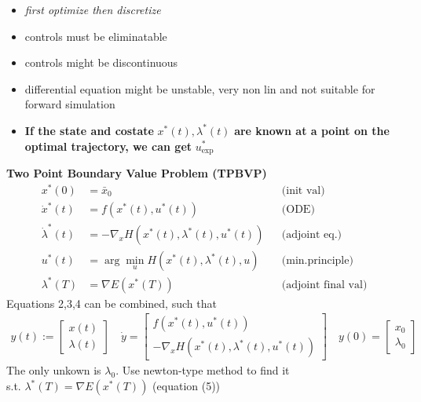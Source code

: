 
\begin{tcolorbox}[colback=gray!5!white,colframe=gray!75!black,title=\textbf{Indirect Approach}]
\begin{itemize}
	\item \textit{first optimize then discretize}
	\item controls must be eliminatable
	\item controls might be discontinuous
	\item differential equation might be unstable, very non lin and not suitable
    for forward simulation
  \item \textbf{If the state and costate} $x^*(t),\lambda^*(t)$ \textbf{are known at a point on
    the optimal trajectory, we can get} $u^*_{\mathrm{exp}}$ \\
\end{itemize}
\textbf{Two Point Boundary Value Problem (TPBVP)}
\begin{align}
	x^*(0) &= \bar{x}_0 & & \text{(init val)} \tag{1}\\
	\dot{x}^*(t) &= f(x^*(t), u^*(t))& %
                        & \text{(ODE)}\tag{2}\\
	\dot{\lambda}^*(t) &= - \nabla_x H(x^*(t), \lambda^*(t), u^*(t)) &%
                        & \text{(adjoint eq.)}\tag{3}\\
	u^*(t) &= \arg \min_u H(x^*(t), \lambda^*(t), u) & & \text{(min.principle)}\tag{4}\\
	\lambda^*(T) &= \nabla E(x^*(T)) & & \text{(adjoint final val)}\tag{5}
\end{align}
Equations 2,3,4 can be combined, such that
\begin{align*}
	y(t) := \begin{bmatrix}
	x(t) \\ \lambda(t)
	\end{bmatrix}
	 \quad
	 \dot{y} =
	 \begin{bmatrix}
		 f(x^*(t), u^*(t))\\
		 - \nabla_x H(x^*(t), \lambda^*(t), u^*(t))
	 \end{bmatrix}
 	\quad
 	y(0) = \begin{bmatrix}
		x_0\\ \lambda_0
 	\end{bmatrix}
\end{align*}
The only unkown is $\lambda_0$. Use newton-type method to find it\\s.t.
$\lambda^*(T) = \nabla E(x^*(T)) $ (equation (5))\\


\end{tcolorbox}
